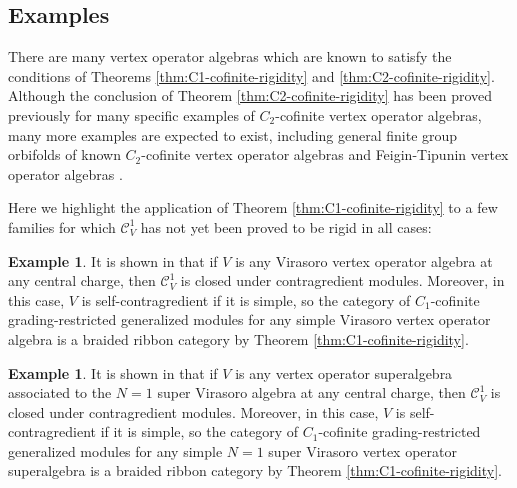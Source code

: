 \documentclass[11pt, reqno]{amsart}
\theoremstyle{definition}\newtheorem{defi}[thm]{Definition}
\theoremstyle{definition}\newtheorem{rem}[thm]{Remark}
\theoremstyle{definition}\newtheorem{exam}[thm]{Example}
\theoremstyle{definition}\newtheorem{assum}[thm]{Assumption}
\newcommand{\cC}{\mathcal{C}}
\begin{document}
\subsection{Examples}

There are many vertex operator algebras which are known to satisfy the conditions of Theorems \ref{thm:C1-cofinite-rigidity} and \ref{thm:C2-cofinite-rigidity}. Although the conclusion of Theorem \ref{thm:C2-cofinite-rigidity} has been proved previously for many specific examples of $C_2$-cofinite vertex operator algebras, many more examples are expected to exist, including general finite group orbifolds of known $C_2$-cofinite vertex operator algebras and Feigin-Tipunin vertex operator algebras \cite{FT, Su}.


 Here we highlight the application of Theorem \ref{thm:C1-cofinite-rigidity} to a few families for which $\cC_V^1$ has not yet been proved to be rigid in all cases:
\begin{exam}
It is shown in \cite{CJORY} that if $V$ is any Virasoro vertex operator algebra at any central charge, then $\cC_V^1$ is closed under contragredient modules. Moreover, in this case, $V$ is self-contragredient if it is simple, so the category of $C_1$-cofinite grading-restricted generalized modules for any simple Virasoro vertex operator algebra is a braided ribbon category by Theorem \ref{thm:C1-cofinite-rigidity}.
\end{exam}

\begin{exam}
It is shown in \cite{CMOY} that if $V$ is any vertex operator superalgebra associated to the $N=1$ super Virasoro algebra at any central charge, then $\cC_V^1$ is closed under contragredient modules. Moreover, in this case, $V$ is self-contragredient if it is simple, so the category of $C_1$-cofinite grading-restricted generalized modules for any simple $N=1$ super Virasoro vertex operator superalgebra is a braided ribbon category by Theorem \ref{thm:C1-cofinite-rigidity}.
\end{exam}
\end{document}
